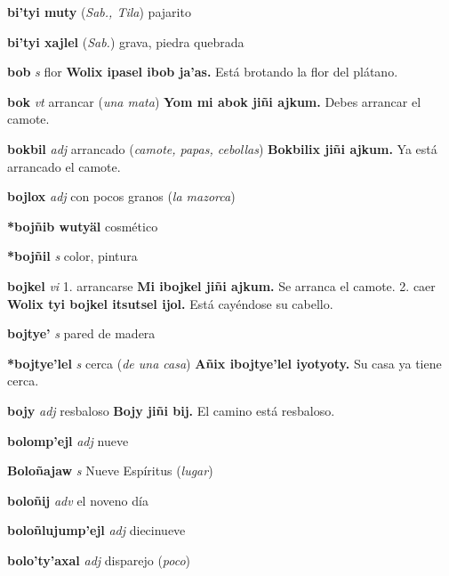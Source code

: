 \documentclass[10pt]{scrbook}
\newcommand{\entry}[1]{\textbf{#1}}
\newcommand{\onedefinition}[1]{#1.}
\newcommand{\partofspeech}[1]{\textit{#1}}
\newcommand{\spanishtranslation}[1]{#1}
\newcommand{\clarification}[1]{(\textit{#1})}
\newcommand{\cholexample}[1]{\textbf{#1}}
\newcommand{\exampletranslation}[1]{#1}
\newcommand{\relevantdialect}[1]{(\textit{#1})}
\begin{document}
\begin{multicols}{2}
\entry{bi'tyi muty}
\relevantdialect{Sab., Tila}
\spanishtranslation{pajarito}

\entry{bi'tyi xajlel}
\relevantdialect{Sab.}
\spanishtranslation{grava, piedra quebrada}

\entry{bob}
\partofspeech{s}
\spanishtranslation{flor}
\cholexample{Wolix ipasel ibob ja'as.}
\exampletranslation{Está brotando la flor del plátano.}

\entry{bok}
\partofspeech{vt}
\spanishtranslation{arrancar}
\clarification{una mata}
\cholexample{Yom mi abok jiñi ajkum.}
\exampletranslation{Debes arrancar el camote.}

\entry{bokbil}
\partofspeech{adj}
\spanishtranslation{arrancado}
\clarification{camote, papas, cebollas}
\cholexample{Bokbilix jiñi ajkum.}
\exampletranslation{Ya está arrancado el camote.}

\entry{bojlox}
\partofspeech{adj}
\spanishtranslation{con pocos granos}
\clarification{la mazorca}

\entry{*bojñib wutyäl}
\spanishtranslation{cosmético}

\entry{*bojñil}
\partofspeech{s}
\spanishtranslation{color, pintura}

\entry{bojkel}
\partofspeech{vi}
\onedefinition{1}
\spanishtranslation{arrancarse}
\cholexample{Mi ibojkel jiñi ajkum.}
\exampletranslation{Se arranca el camote.}
\onedefinition{2}
\spanishtranslation{caer}
\cholexample{Wolix tyi bojkel itsutsel ijol.}
\exampletranslation{Está cayéndose su cabello.}

\entry{bojtye'}
\partofspeech{s}
\spanishtranslation{pared de madera}

\entry{*bojtye'lel}
\partofspeech{s}
\spanishtranslation{cerca}
\clarification{de una casa}
\cholexample{Añix ibojtye'lel iyotyoty.}
\exampletranslation{Su casa ya tiene cerca.}

\entry{bojy}
\partofspeech{adj}
\spanishtranslation{resbaloso}
\cholexample{Bojy jiñi bij.}
\exampletranslation{El camino está resbaloso.}

\entry{bolomp'ejl}
\partofspeech{adj}
\spanishtranslation{nueve}

\entry{Boloñajaw}
\partofspeech{s}
\spanishtranslation{Nueve Espíritus}
\clarification{lugar}

\entry{boloñij}
\partofspeech{adv}
\spanishtranslation{el noveno día}

\entry{boloñlujump'ejl}
\partofspeech{adj}
\spanishtranslation{diecinueve}

\entry{bolo'ty'axal}
\partofspeech{adj}
\spanishtranslation{disparejo}
\clarification{poco}


\end{multicols}
\end{document}
